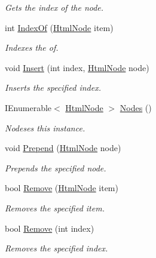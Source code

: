 \begin{DoxyCompactItemize}
\begin{DoxyCompactList}\small\item\em Gets the index of the node. \end{DoxyCompactList}\item 
int \hyperlink{class_html_agility_pack_1_1_html_node_collection_ab40a4c24bcd19eccb2b49dcd5da0794e}{Index\+Of} (\hyperlink{class_html_agility_pack_1_1_html_node}{Html\+Node} item)
\begin{DoxyCompactList}\small\item\em Indexes the of. \end{DoxyCompactList}\item 
void \hyperlink{class_html_agility_pack_1_1_html_node_collection_a0097b0c06138a7baabf08048bce9d1f6}{Insert} (int index, \hyperlink{class_html_agility_pack_1_1_html_node}{Html\+Node} node)
\begin{DoxyCompactList}\small\item\em Inserts the specified index. \end{DoxyCompactList}\item 
I\+Enumerable$<$ \hyperlink{class_html_agility_pack_1_1_html_node}{Html\+Node} $>$ \hyperlink{class_html_agility_pack_1_1_html_node_collection_a03326670b5a9221a648c76136371a5a6}{Nodes} ()
\begin{DoxyCompactList}\small\item\em Nodeses this instance. \end{DoxyCompactList}\item 
void \hyperlink{class_html_agility_pack_1_1_html_node_collection_a78673ebcce85f224de5cd11f807ed319}{Prepend} (\hyperlink{class_html_agility_pack_1_1_html_node}{Html\+Node} node)
\begin{DoxyCompactList}\small\item\em Prepends the specified node. \end{DoxyCompactList}\item 
bool \hyperlink{class_html_agility_pack_1_1_html_node_collection_a4c67bb2596e9bfe3bb1b43fd3e28236f}{Remove} (\hyperlink{class_html_agility_pack_1_1_html_node}{Html\+Node} item)
\begin{DoxyCompactList}\small\item\em Removes the specified item. \end{DoxyCompactList}\item 
bool \hyperlink{class_html_agility_pack_1_1_html_node_collection_a6ffb19c5be316377dcc9f53f45f70653}{Remove} (int index)
\begin{DoxyCompactList}\small\item\em Removes the specified index. \end{DoxyCompactList}\item 

\end{DoxyCompactItemize}

